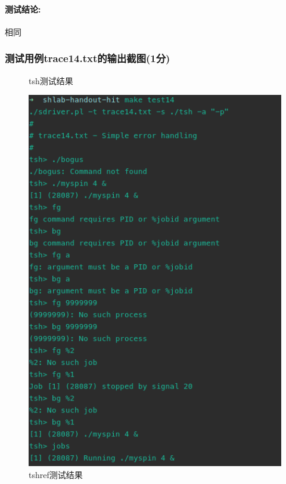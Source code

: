 \paragraph{测试结论:}相同

\subsubsection{测试用例trace14.txt的输出截图(1分)}

\begin{figure}[H]
    \begin{minipage}[c]{0.5\linewidth}
        \centering
        \caption{tsh测试结果}
        \includegraphics[width=0.7\linewidth]{figures/test14.png}
    \end{minipage}
    \begin{minipage}[c]{0.5\linewidth}
        \centering
        \caption{tshref测试结果}

\end{minipage}
\end{figure}
